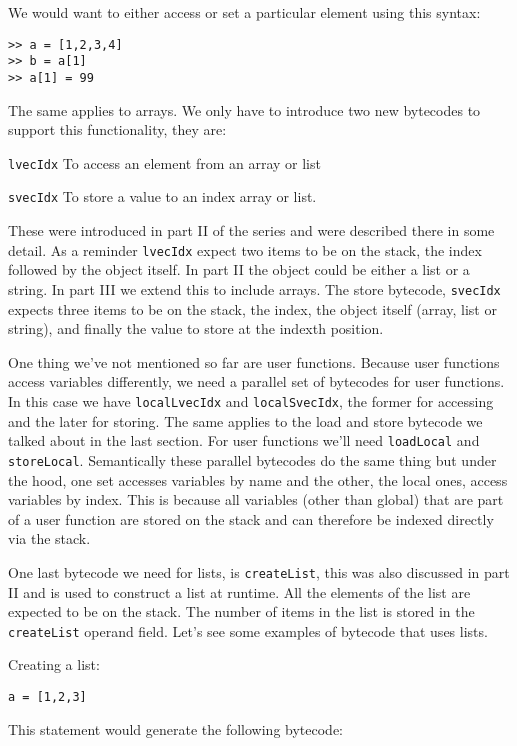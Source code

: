 We would want to either access or set a particular element using this syntax:

\begin{lstlisting}
>> a = [1,2,3,4]
>> b = a[1]
>> a[1] = 99
\end{lstlisting}

The same applies to arrays. We only have to introduce two new bytecodes to support this functionality, they are:

{\tt lvecIdx} To access an element from an array or list

{\tt svecIdx} To store a value to an index array or list.

These were introduced in part II of the series and were described there in some detail. As a reminder {\tt lvecIdx} expect two items to be on the stack, the index followed by the object itself. In part II the object could be either a list or a string. In part III we extend this to include arrays. The store bytecode, {\tt svecIdx}  expects three items to be on the stack, the index, the object itself (array, list or string), and finally the value to store at the indexth position.

One thing we've not mentioned so far are user functions. Because user functions access variables differently, we need a parallel set of bytecodes for user functions. In this case we have {\tt localLvecIdx} and {\tt localSvecIdx}, the former for accessing and the later for storing. The same applies to the load and store bytecode we talked about in the last section. For user functions we'll need {\tt loadLocal} and {\tt storeLocal}. Semantically these parallel bytecodes do the same thing but under the hood, one set accesses variables by name and the other, the local ones, access variables by index. This is because all variables (other than global) that are part of a user function are stored on the stack and can therefore be indexed directly via the stack.

One last bytecode we need for lists, is {\tt createList}, this was also discussed in part II and is used to construct a list at runtime. All the elements of the list are expected to be on the stack. The number of items in the list is stored in the {\tt createList} operand field. Let's see some examples of bytecode that uses lists.

Creating a list:

\begin{lstlisting}
a = [1,2,3]
\end{lstlisting}

This statement would generate the following bytecode:

